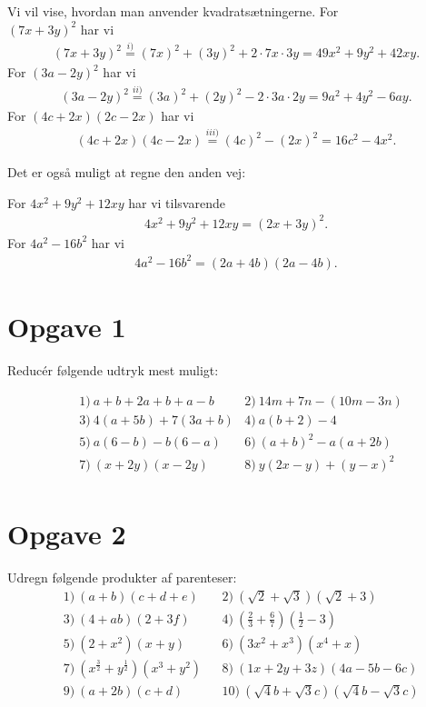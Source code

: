\begin{exa}
Vi vil vise, hvordan man anvender kvadratsætningerne. For \\$(7x+3y)^2$ har vi
\begin{align*}
(7x+3y)^2 \overset{i)}{=} (7x)^2+(3y)^2+2\cdot 7x\cdot 3y = 49x^2+9y^2+42xy.
\end{align*}
For $(3a-2y)^2$ har vi
\begin{align*}
(3a-2y)^2 \overset{ii)}{=} (3a)^2+(2y)^2 -2\cdot 3a\cdot 2y = 9a^2 + 4y^2-6ay.
\end{align*}
For $(4c+2x)(2c-2x)$ har vi
\begin{align*}
(4c+2x)(4c-2x) \overset{iii)}{=} (4c)^2-(2x)^2 = 16c^2-4x^2.
\end{align*}
\end{exa}
Det er også muligt at regne den anden vej:
\begin{exa}
For $4x^2+9y^2+12xy$ har vi tilsvarende
\begin{align*}
4x^2+9y^2+12xy = (2x+3y)^2.
\end{align*}
For $4a^2-16b^2$ har vi
\begin{align*}
   4a^2-16b^2 = (2a+4b)(2a-4b).
\end{align*}
\end{exa}

\section*{Opgave 1}
Reducér følgende udtryk mest muligt:

\begin{align*}
	&1) \  a+b+2a+b+a-b  &2) \  14m+7n-(10m-3n)     \\
	&3) \  4(a+5b) + 7(3a+b)   &4) \  a(b + 2) - 4      \\
	&5) \ a(6-b) - b(6-a)   &6) \ (a+b)^2 -a(a+2b)       \\
	&7) \ (x+2y)(x-2y)    &8) \ y(2x-y)+(y-x)^2      \\
\end{align*}
\section*{Opgave 2}
Udregn følgende produkter af parenteser:
\begin{align*}
&1) \ (a+b)(c+d+e)  &&2) \ (\sqrt{2}+\sqrt{3})(\sqrt{2}+3)  \\
 &3) \ (4+ab)(2+3f)   &&4) \ (\frac{2}{3} + \frac{6}{7})(\frac{1}{2} - 3)  \\
 &5) \ (2+x^2)(x+y)  &&6) \ (3x^2+x^3)(x^4+x)  \\
 &7) \ (x^{\frac{3}{2}}+y^{\frac{1}{2}})(x^{3}+y^2)  &&8) \ (1x+2y+3z)(4a-5b-6c)  \\
 &9) \ (a+2b)(c+d)   &&10) \ (\sqrt{4}b+\sqrt{3}c)(\sqrt{4}b-\sqrt{3}c)  \\
\end{align*}
